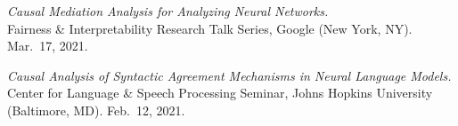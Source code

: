 \documentclass[10pt]{article}
\renewcommand{\section}[1]{\pagebreak[3]%
	\vspace{0.5\baselineskip}%
	\phantomsection\addcontentsline{toc}{section}{#1}%
	\noindent\llap{\bf\scshape\smash{\parbox[t]{\marginparwidth}{\hyphenpenalty=10000\raggedright \textcolor{black}{#1}}}}%
	\vspace{-\baselineskip}\par}
\newcommand{\halfblankline}{\quad\vspace{-0.5\baselineskip}\pagebreak[3]}
\begin{document}
	\halfblankline

	\emph{Causal Mediation Analysis for Analyzing Neural Networks.}\\Fairness \& Interpretability Research Talk Series, Google (New York, NY). Mar.\ 17, 2021.
	
	\halfblankline

	\emph{Causal Analysis of Syntactic Agreement Mechanisms in Neural Language Models.}\\Center for Language \& Speech Processing Seminar, Johns Hopkins University (Baltimore, MD). Feb.\ 12, 2021.
	
	\halfblankline




	

\end{document}
